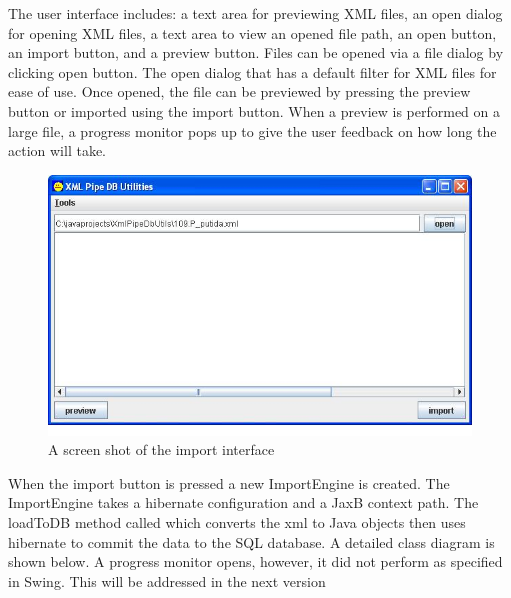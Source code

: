 \par
The user interface includes: a text area for previewing XML files, an open dialog for opening XML files, a text area to view an opened file path, an open button, an import button, and a preview button. Files can be opened via a file dialog by clicking open button. The open dialog that has a default filter for XML files for ease of use. Once opened, the file can be previewed by pressing the preview button or imported using the import button. When a preview is performed on a large file, a progress monitor pops up to give the user feedback on how long the action will take. 
\begin{figure}[h]
	\centering
		\includegraphics[width=1.00\textwidth]{Images/ImportScreenshot2.jpg}
	\caption{A screen shot of the import interface}
	\label{fig:ImportScreenshot}
\end{figure}


\par	
When the import button is pressed a new ImportEngine is created. The ImportEngine takes a hibernate configuration and a JaxB context path. The loadToDB method called which converts the xml to Java objects then uses hibernate to commit the data to the SQL database. A detailed class diagram is shown below. A progress monitor opens, however, it did not perform as specified in Swing. This will be addressed in the next version

